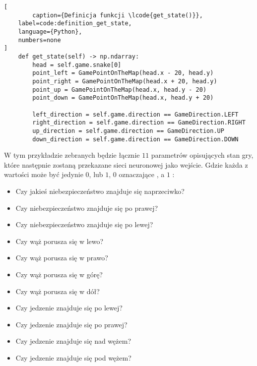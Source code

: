 \begin{onepage}
    \begin{lstlisting}[
        caption={Definicja funkcji \lcode{get_state()}},
    label=code:definition_get_state,
    language={Python},
    numbers=none
]
    def get_state(self) -> np.ndarray:
        head = self.game.snake[0]
        point_left = GamePointOnTheMap(head.x - 20, head.y)
        point_right = GamePointOnTheMap(head.x + 20, head.y)
        point_up = GamePointOnTheMap(head.x, head.y - 20)
        point_down = GamePointOnTheMap(head.x, head.y + 20)

        left_direction = self.game.direction == GameDirection.LEFT
        right_direction = self.game.direction == GameDirection.RIGHT
        up_direction = self.game.direction == GameDirection.UP
        down_direction = self.game.direction == GameDirection.DOWN
    \end{lstlisting}
\end{onepage}

W tym przykładzie zebranych będzie łącznie $11$ parametrów opisujących stan gry, które następnie zostaną przekazane sieci neuronowej jako wejście. Gdzie każda z wartości może być jedynie $0$, lub $1$, $0$ oznaczające , a $1$ :

\begin{itemize}
    \item Czy jakieś niebezpieczeństwo znajduje się naprzeciwko?
    \item Czy niebezpieczeństwo znajduje się po prawej?
    \item Czy niebezpieczeństwo znajduje się po lewej?
    \item Czy wąż porusza się w lewo?
    \item Czy wąż porusza się w prawo?
    \item Czy wąż porusza się w górę?
    \item Czy wąż porusza się w dół?
    \item Czy jedzenie znajduje się po lewej?
    \item Czy jedzenie znajduje się po prawej?
    \item Czy jedzenie znajduje się nad wężem?
    \item Czy jedzenie znajduje się pod wężem?
\end{itemize}


